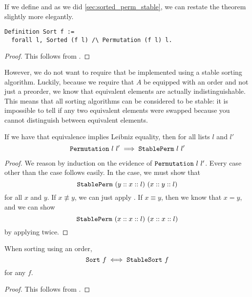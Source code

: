 \documentclass[sigplan,10pt,anonymous,review]{thesis}
\begin{document}
If we define  and  as we did
\cref{sec:sorted_perm_stable}, we can restate the theorem slightly
more elegantly.
\begin{lstlisting}
Definition Sort f :=
  forall l, Sorted (f l) /\ Permutation (f l) l.
\end{lstlisting}

\stablesortunique
\begin{proof}
  This follows from .
\end{proof}

However, we do not want to require that  be implemented
using a stable sorting algorithm. Luckily, because we require that $A$
be equipped with an order and not just a preorder, we know that
equivalent elements are actually indistinguishable. This means that
all sorting algorithms can be considered to be stable: it is
impossible to tell if any two equivalent elements were swapped because
you cannot distinguish between equivalent elements.

\begin{theorem}
  If we have that equivalence implies Leibniz equality, then for all
  lists $l$ and $l'$
  \begin{equation*}
      \texttt{\textup{Permutation}}~l~l' \implies \texttt{\textup{StablePerm}}~l~l'
  \end{equation*}
\end{theorem}
\begin{proof}
  We reason by induction on the evidence of $\texttt{\textup{Permutation}}~l~l'$.
  Every case other than the  case follows easily.
  In the  case, we must show that
  \begin{equation*}
    \texttt{\textup{StablePerm}}~(y :: x :: l)~(x :: y :: l)
  \end{equation*}
  for all $x$ and $y$. If $x \not\equiv y$, we can just apply
  . If $x \equiv y$, then we know that $x = y$, and
  we can show
  \begin{equation*}
    \texttt{\textup{StablePerm}}~(x :: x :: l)~(x :: x :: l)
  \end{equation*}
  by applying  twice.
\end{proof}

\begin{corollary}
  \label{thm:stablesort_ord}
  When sorting using an order,
  \begin{equation*}
    \texttt{\textup{Sort}}~f \iff \texttt{\textup{StableSort}}~f
  \end{equation*}
  for any $f$.
\end{corollary}
\begin{proof}
  This follows from .
\end{proof}
\end{document}
